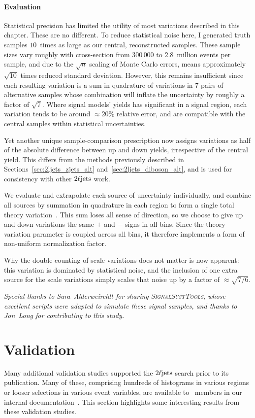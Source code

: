 \paragraph{Evaluation}
Statistical precision has limited the utility of most variations described in
this chapter.
These are no different.
To reduce statistical noise here, I generated truth samples $10$~times as large
as our central, reconstructed samples.
These sample sizes vary roughly with cross-section from $300\,000$ to
$2.8$~million events per sample, and due to the $\sqrt{n}$ scaling of
Monte Carlo errors, means approximately $\sqrt{10}$ times reduced
standard deviation.
However, this remains insufficient since each resulting variation is a
sum in quadrature of variations in $7$ pairs of alternative samples
whose combination will inflate the uncertainty by roughly a factor of
$\sqrt{7}$.
Where signal models' yields has significant in a signal region,
each variation tends to be around $\approx 20\%$ relative error,
and are compatible with the central samples within statistical uncertainties.

Yet another unique sample-comparison prescription now assigns variations as
half of the absolute difference between up and down yields, irrespective of the
central yield.
This differs from the methods previously described in
Sections~\ref{sec:2ljets_zjets_alt} and~\ref{sec:2ljets_diboson_alt},
and is used for consistency with other $2\ell\mathrm{jets}$ work.

We evaluate and extrapolate each source of uncertainty individually,
and combine all sources by summation in quadrature in each region to form a
single total theory variation~\cite{atlas_twiki_susytheoretical}.
This sum loses all sense of direction, so we choose to give up and down
variations the same $+$ and $-$ signs in all bins.
Since the theory variation parameter is coupled across all bins, it therefore
implements a form of non-uniform normalization factor.

Why the double counting of scale variations does not matter is now apparent:
this variation is dominated by statistical noise, and the inclusion of one
extra source for the scale variations simply scales that noise up by
a factor of $\approx \sqrt{7/6}$.

\emph{%
Special thanks to Sara~Alderweireldt for sharing \textsc{SignalSystTools},
whose excellent scripts were adapted to simulate these signal
samples, and thanks to Jon~Long for contributing to this study.
}

\section{Validation}
\label{sec:2ljets_validation}
Many additional validation studies supported the $2\ell\mathrm{jets}$ search prior to
its publication.
Many of these, comprising hundreds of histograms in various regions or looser
selections in various event variables, are available to \atlas\ members in
our internal documentation~\cite{twoljets2018int}.
This section highlights some interesting results from these validation studies.


